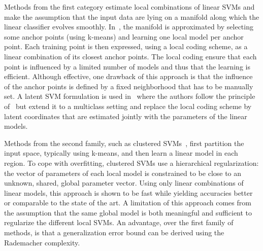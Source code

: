 
Methods from the first category estimate local combinations of linear SVMs and make the assumption that the input data are lying on a manifold along which the linear classifier evolves smoothly.
In~\cite{ladicky2011locally}, the manifold is approximated by selecting some anchor points (using k-means) and learning one local model per anchor point.
Each training point is then expressed, using a local coding scheme, as a linear combination of its closest anchor points.
The local coding ensure that each point is influenced by a limited number of models and thus that the learning is efficient.
Although effective, one drawback of this approach is that the influence of the anchor points is defined by a fixed neighborhood that has to be manually set.
A latent SVM formulation is used in~\cite{fornoni2013multiclass} where the authors follow the principle of~\cite{ladicky2011locally} but extend it to a multiclass setting and replace the local coding scheme by latent coordinates that are estimated jointly with the parameters of the linear models.


Methods from the second family, such as clustered SVMs~\cite{gu2013clustered}, first partition the input space, typically using k-means, and then learn a linear model in each region.
To cope with overfitting, clustered SVMs use a hierarchical regularization: the vector of parameters of each local model is constrained to be close to an unknown, shared, global parameter vector.
Using only linear combinations of linear models, this approach is shown to be fast while yielding accuracies better or comparable to the state of the art.
A limitation of this approach comes from the assumption that the same global model is both meaningful and sufficient to regularize the different local SVMs.
An advantage, over the first family of methods, is that a generalization error bound can be derived using the Rademacher complexity.

